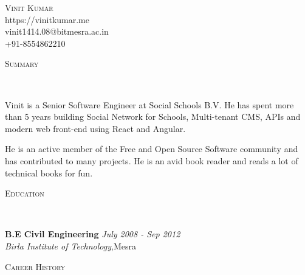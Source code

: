\documentclass[9pt]{article}
\newenvironment{changemargin}[2]{%
  \begin{list}{}{%
    \setlength{\topsep}{0pt}%
    \setlength{\leftmargin}{#1}%
    \setlength{\rightmargin}{#2}%
    \setlength{\listparindent}{\parindent}%
    \setlength{\itemindent}{\parindent}%
    \setlength{\parsep}{\parskip}%
  }%
  \item[]}{\end{list}
}
\newcommand{\lineover}{
    \begin{changemargin}{-0.05in}{-0.05in}
        \vspace*{-8pt}
        \hrulefill \\
        \vspace*{-2pt}
    \end{changemargin}
}
\newcommand{\header}[1]{
    \begin{changemargin}{-0.5in}{-0.5in}
        \scshape{#1}\\
    \lineover
    \end{changemargin}
}
\newcommand{\contact}[4]{
    \begin{changemargin}{-0.5in}{-0.5in}
        \begin{center}
            {\Large \scshape {#1}}\\ \smallskip
            {#2}\\ \smallskip
            {#3}\\ \smallskip
            {#4}\smallskip
        \end{center}
    \end{changemargin}
}
\newenvironment{body} {
    \vspace*{-16pt}
    \begin{changemargin}{-0.25in}{-0.5in}
  }
    {\end{changemargin}
}
\begin{document}
\contact{Vinit Kumar}{https://vinitkumar.me}{vinit1414.08@bitmesra.ac.in}{+91-8554862210}


\header{Summary}

\begin{body}
    \vspace{14pt}
Vinit is a Senior Software Engineer at Social Schools B.V.
He has spent more than 5 years building Social Network for Schools, Multi-tenant CMS, APIs and modern web front-end using React and Angular.

He is an active member of the Free and Open Source Software community and has contributed to many projects. He is an avid book reader and reads a lot of technical books for fun.

\end{body}

\smallskip


\header{Education}

\begin{body}
    \vspace{14pt}
    \textbf{B.E Civil Engineering }{} \hfill \emph{July 2008 - Sep 2012}{} \\
    \emph{Birla Institute of Technology},Mesra{} \\
\end{body}

\smallskip


\header{Career History}
\end{document}

